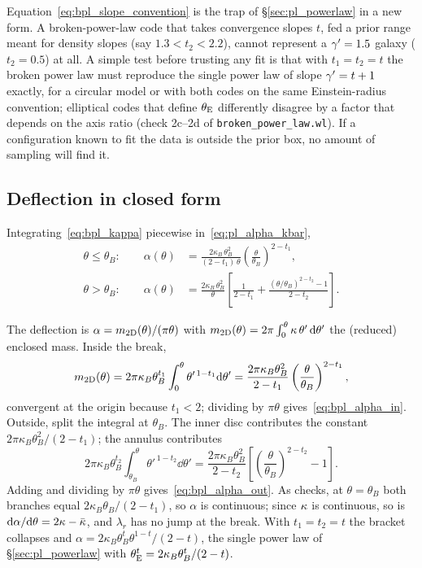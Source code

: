 \begin{annotation}
Equation~\eqref{eq:bpl_slope_convention} is the trap of
\S\ref{sec:pl_powerlaw} in a new form.  A broken-power-law code that
takes convergence slopes $t$, fed a prior range meant for density
slopes (say $1.3<t_2<2.2$), cannot represent a $\gamma'=1.5$ galaxy
($t_2=0.5$) at all.  A simple test before trusting any fit is that with
$t_1=t_2=t$ the broken power law must reproduce the single power law
of slope $\gamma'=t+1$ exactly, for a circular model or with both codes on
the same Einstein-radius convention; elliptical codes that define
$\theta_{\mathrm{E}}$ differently disagree by a factor that depends on the axis
ratio (check 2c--2d of
\texttt{broken\_power\_law.wl}).  If a configuration known to fit the
data is outside the prior box, no amount of sampling will find it.
\end{annotation}

\subsection{Deflection in closed form}
\label{sec:bpl_deflection}

Integrating~\eqref{eq:bpl_kappa} piecewise
in~\eqref{eq:pl_alpha_kbar},
\begin{align}
    \theta\le\theta_B:\qquad
    \alpha(\theta) &= \frac{2\kappa_B\,\theta_B^{2}}{(2-t_1)\,\theta}
                     \left(\frac{\theta}{\theta_B}\right)^{2-t_1} ,
    \label{eq:bpl_alpha_in}\\[4pt]
    \theta>\theta_B:\qquad
    \alpha(\theta) &= \frac{2\kappa_B\,\theta_B^{2}}{\theta}
    \left[\frac{1}{2-t_1}+\frac{(\theta/\theta_B)^{2-t_2}-1}{2-t_2}\right] .
    \label{eq:bpl_alpha_out}
\end{align}

\begin{derivation}
The deflection is $\alpha=m_{2\rm D}(\theta)/(\pi\theta)$ with
$m_{2\rm D}(\theta)=2\pi\int_0^\theta\kappa\,\theta'\,\dd\theta'$ the
(reduced) enclosed mass.  Inside the break,
\[
  m_{2\rm D}(\theta)=2\pi\kappa_B\theta_B^{t_1}\int_0^\theta\theta'^{\,1-t_1}\dd\theta'
  =\frac{2\pi\kappa_B\theta_B^{2}}{2-t_1}\left(\frac{\theta}{\theta_B}\right)^{2-t_1} ,
\]
convergent at the origin because $t_1<2$; dividing by $\pi\theta$
gives~\eqref{eq:bpl_alpha_in}.  Outside, split the integral at
$\theta_B$.  The inner disc contributes the constant
$2\pi\kappa_B\theta_B^2/(2-t_1)$; the annulus contributes
\[
  2\pi\kappa_B\theta_B^{t_2}\int_{\theta_B}^\theta\theta'^{\,1-t_2}\dd\theta'
  =\frac{2\pi\kappa_B\theta_B^{2}}{2-t_2}\left[\left(\frac{\theta}{\theta_B}\right)^{2-t_2}-1\right] .
\]
Adding and dividing by $\pi\theta$ gives~\eqref{eq:bpl_alpha_out}.
As checks, at $\theta=\theta_B$ both branches equal
$2\kappa_B\theta_B/(2-t_1)$, so $\alpha$ is continuous; since $\kappa$
is continuous, so is $\dd\alpha/\dd\theta=2\kappa-\bar\kappa$, and
$\lambda_r$ has no jump at the break.  With $t_1=t_2=t$ the bracket
collapses and $\alpha=2\kappa_B\theta_B^t\theta^{1-t}/(2-t)$, the single
power law of \S\ref{sec:pl_powerlaw} with
$\theta_{\mathrm{E}}^{t}=2\kappa_B\theta_B^t/(2-t)$.
\end{derivation}

